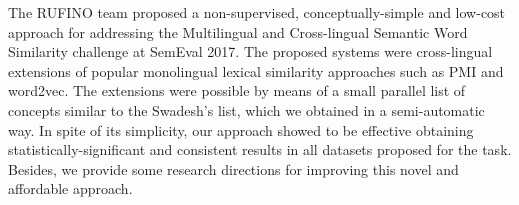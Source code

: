 The RUFINO team proposed a non-supervised, conceptually-simple and low-cost approach for addressing the Multilingual and Cross-lingual Semantic Word Similarity challenge at SemEval 2017. The proposed systems were cross-lingual extensions of popular monolingual lexical similarity approaches such as PMI and word2vec. The extensions were possible by means of a small parallel list of concepts similar to the Swadesh's list, which we obtained in a semi-automatic way. In spite of its simplicity, our approach showed to be effective obtaining statistically-significant and consistent results in all datasets proposed for the task. Besides, we provide some research directions for improving this novel and affordable approach.
